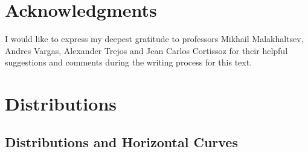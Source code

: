 \documentclass[12pt, letterpaper, reqno]{amsart}
\theoremstyle{definition}
\theoremstyle{plain}
\theoremstyle{remark}
\begin{document}
\section*{Acknowledgments}
I would like to express my deepest gratitude to professors Mikhail Malakhaltsev, Andres Vargas, Alexander Trejos and Jean Carlos Cortissoz for their helpful suggestions and comments during the writing process for this text.
\section{Distributions}

\label{sec:1}

\subsection{Distributions and Horizontal Curves}%
\label{sub:distributions}
\end{document}
